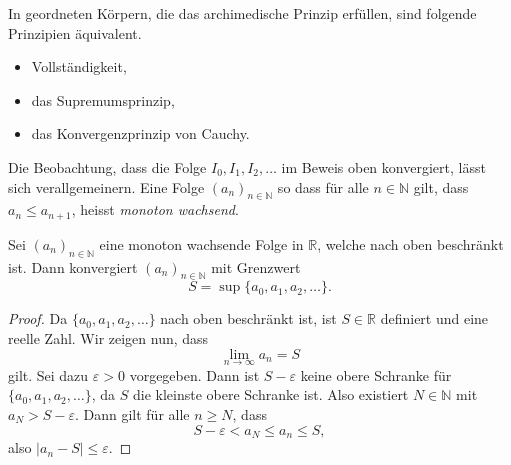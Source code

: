 \documentclass[../main.tex]{subfiles}
\begin{document}
\begin{remark}
  In geordneten Körpern,
  die das archimedische Prinzip erfüllen,
  sind folgende Prinzipien äquivalent.
  \begin{itemize}
    \item Vollständigkeit,
    \item das Supremumsprinzip,
    \item das Konvergenzprinzip von Cauchy.
  \end{itemize}
  
\end{remark}


Die Beobachtung, dass die Folge $I_0, I_1, I_2, \dots$
im Beweis oben konvergiert, lässt sich verallgemeinern.
Eine Folge ${(a_{n})}_{n \in \mathbb{N}}$ 
so dass für alle $n \in \mathbb{N}$ gilt,
dass $a_n \leq a_{n+1}$, heisst \emph{monoton wachsend}.

\begin{monotony}
  Sei ${(a_n)}_{n \in \mathbb{N}}$ eine monoton wachsende
  Folge in $\mathbb{R}$,
  welche nach oben beschränkt ist.
  Dann konvergiert ${(a_n)}_{n \in \mathbb{N}}$ mit
  Grenzwert
  \[
    S = \sup \{a_0, a_1, a_2, \dots\}.
  \]
\end{monotony}

\begin{proof}
  Da $\{a_0, a_1, a_2, \dots\}$ nach oben beschränkt ist,
  ist $S \in \mathbb{R}$ definiert und eine reelle Zahl.
  Wir zeigen nun, dass
  \[
    \lim_{n \to \infty} a_n = S
  \]
  gilt.
  Sei dazu $\varepsilon > 0$ vorgegeben. 
  Dann ist $S - \varepsilon$ keine obere Schranke
  für $\{a_0, a_1, a_2, \dots\}$,
  da $S$ die kleinste obere Schranke ist.
  Also existiert $N \in \mathbb{N}$ mit
  $a_N > S - \varepsilon$.
  Dann gilt für alle $n \geq N$, dass
  \[
    S - \varepsilon < a_N \leq a_n \leq S,
  \]
  also $|a_n - S| \leq \varepsilon$.
\end{proof}
\end{document}
